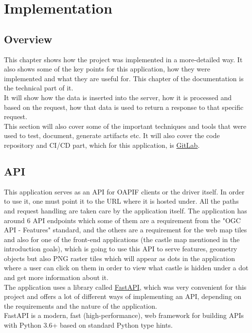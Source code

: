 \chapter{Implementation}

\section{Overview}
This chapter shows how the project was implemented in a more-detailed way. It also shows some of the key points for this application, how they were implemented and what they are useful for. This chapter of the documentation is the technical part of it.\\
It will show how the data is inserted into the server, how it is processed and based on the request, how that data is used to return a response to that specific request.\\
This section will also cover some of the important techniques and tools that were used to test, document, generate artifacts etc. It will also cover the code repository and CI/CD part, which for this application, is \href{https://gitlab.com/}{GitLab}.

\section{API}
This application serves as an API for OAPIF clients or the driver itself. In order to use it, one must point it to the URL where it is hosted under. All the paths and request handling are taken care by the application itself. The application has around 6 API endpoints which some of them are a requirement from the "OGC API - Features" standard, and the others are a requirement for the web map tiles and also for one of the front-end applications (the castle map mentioned in the introduction goals), which is going to use this API to serve features, geometry objects but also PNG raster tiles which will appear as dots in the application where a user can click on them in order to view what castle is hidden under a dot and get more information about it.\\
The application uses a library called \href{https://fastapi.tiangolo.com/}{FastAPI}, which was very convenient for this project and offers a lot of different ways of implementing an API, depending on the requirements and the nature of the application.\\
\newline
FastAPI is a modern, fast (high-performance), web framework for building APIs with Python 3.6+ based on standard Python type hints.

